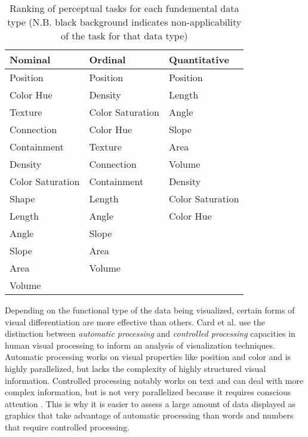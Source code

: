 \begin{table}
    \begin{center}
    \begin{tabular}{ | l | l | l | }
    \hline
    Nominal & Ordinal & Quantitative \\ \hline
    Position & Position & Position \\
    Color Hue & Density & Length \\
    Texture & Color Saturation & Angle \\
    Connection & Color Hue & Slope \\
    Containment & Texture & Area \\
    Density & Connection & Volume \\
    Color Saturation & Containment & Density \\
    Shape & Length & Color Saturation \\
    Length & Angle & Color Hue \\
    Angle & Slope & \cellcolor{black}\textcolor{white}{Texture} \\
    Slope & Area & \cellcolor{black}\textcolor{white}{Connection} \\
    Area & Volume & \cellcolor{black}\textcolor{white}{Containment} \\
    Volume & \cellcolor{black}\textcolor{white}{Shape} & \cellcolor{black}\textcolor{white}{Shape}\\
    \hline
    \end{tabular}
    \end{center}
    \caption{Ranking of perceptual tasks for each fundemental data type (N.B. black background indicates non-applicability of the task for that data type) \cite{jock1986}}
    \label{tab:perceptual}
\end{table}

Depending on the functional type of the data being visualized, certain forms of visual differentiation are more effective than others. Card et al. \cite{card1997} use the distinction between \emph{automatic processing} and \emph{controlled processing} capacities in human visual processing to inform an analysis of visualization techniques. Automatic processing works on visual properties like position and color and is highly parallelized, but lacks the complexity of highly structured visual information. Controlled processing notably works on text and can deal with more complex information, but is not very parallelized because it requires conscious attention \cite{controlauto1977}. This is why it is easier to assess a large amount of data displayed as graphics that take advantage of automatic processing than words and numbers that require controlled processing.

